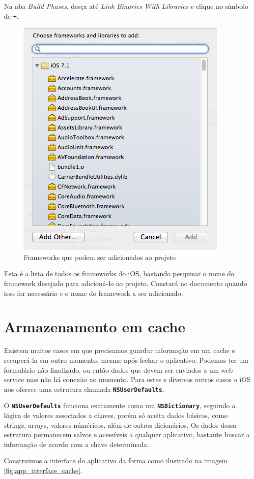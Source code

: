 \documentclass[a4paper,12pt,brazil,oneside]{book}
\begin{document}
Na aba \emph{Build Phases}, desça até \emph{Link Binaries With Libraries} e clique no símbolo de \texttt{+}.

\begin{figure}[H]
  \centering
  \includegraphics[width=.45\textwidth]{figuras/framework4.png}
  \caption{Frameworks que podem ser adicionados ao projeto}
  \label{fig:a}
\end{figure}

Esta é a lista de todos os frameworks do iOS, bastando pesquisar o nome do framework desejado para adicioná-lo ao projeto. Constará no documento quando isso for necessário e o nome do framework a ser adicionado.

\section{Armazenamento em cache}

Existem muitos casos em que precisamos guardar informação em um cache e recuperá-la em outro momento, mesmo após fechar o aplicativo. Podemos ter um formulário não finalizado, ou então dados que devem ser enviados a um web service mas não há conexão no momento. Para estes e diversos outros casos o iOS nos oferece uma estrutura chamada \texttt{\textbf{NSUserDefaults}}.

O \texttt{\textbf{NSUserDefaults}} funciona exatamente como um \texttt{\textbf{NSDictionary}}, seguindo a lógica de valores associados a chaves, porém só aceita dados básicos, como strings, arrays, valores núméricos, além de outros dicionários. Os dados dessa estrutura permanecem salvos e acessíveis a qualquer aplicativo, bastante buscar a informação de acordo com a chave determinada.

Construimos a interface do aplicativo da forma como ilustrado na imagem \ref{fig:app_interface_cache}.
\end{document}

